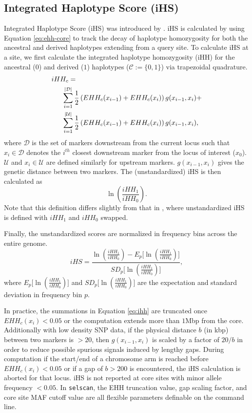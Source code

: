 \documentclass[12pt]{article}%
\newcommand{\negspace}{\!\!\!\!\!\!\!\!\!\!\!\!}
\begin{document}
\subsection{Integrated Haplotype Score (iHS)}\label{sec:ihs}

Integrated Haplotype Score (iHS) was introduced by \cite{VoightEtAl06}. iHS is calculated by using Equation \ref{eq:ehh-core} to track the decay of haplotype homozygosity
for both the ancestral and derived haplotypes extending from a query site.
To calculate iHS at a site, we first calculate the integrated haplotype 
homozygosity (iHH) for the ancestral ($0$) and derived ($1$) haplotypes 
($\mathcal{C} := \{0,1\}$) via trapezoidal quadrature.
\begin{align}\label{eq:ihh}
iHH_c =& \notag\\
&\negspace\sum_{i = 1}^{|\mathcal{D}|} \frac{1}{2}\left(EHH_c(x_{i-1}) + EHH_c(x_i)\right)g(x_{i-1},x_i) + \notag\\
&\negspace\sum_{i = 1}^{|\mathcal{U}|} \frac{1}{2}\left(EHH_c(x_{i-1}) + EHH_c(x_i)\right)g(x_{i-1},x_i),
\end{align}
where $\mathcal{D}$ is the set of markers downstream from the current locus 
such that $x_i \in \mathcal{D}$ denotes the $i^{th}$ closest downstream 
marker from the locus of interest ($x_0$). $\mathcal{U}$ and $x_i \in \mathcal{U}$ are defined similarly 
for upstream markers. $g(x_{i-1},x_i)$ gives the genetic distance between two 
markers.  The (unstandardized) iHS is then calculated as
\begin{equation}
\ln\left(\frac{iHH_1}{iHH_0}\right).
\end{equation}
Note that this definition differs slightly from that in \cite{VoightEtAl06}, where 
unstandardized iHS is defined with $iHH_1$ and $iHH_0$ swapped.

Finally, the unstandardized scores are normalized in frequency bins across the 
entire genome.
\begin{equation}
iHS = \frac{\ln\left(\frac{iHH_1}{iHH_0}\right) - E_p\Big[\ln\left(\frac{iHH_1}{iHH_0}\right)\Big]}{SD_p\Big[\ln\left(\frac{iHH_1}{iHH_0}\right)\Big]},
\end{equation}
where $E_p\Big[\ln\left(\frac{iHH_1}{iHH_0}\right)\Big]$ and 
$SD_p\Big[\ln\left(\frac{iHH_1}{iHH_0}\right)\Big]$ are the expectation and 
standard deviation in frequency bin $p$.

In practice, the summations in Equation \ref{eq:ihh} are truncated once 
$EHH_c(x_i) < 0.05$ or the computation extends more than $1$Mbp from the core.  Additionally with low density SNP data, if the physical 
distance $b$ (in kbp) between two markers is $> 20$, then $g(x_{i-1},x_i)$ is 
scaled by a factor of $20/b$ in order to reduce possible spurious signals 
induced by lengthy gaps.  During computation if the start/end of a chromosome 
arm is reached before $EHH_c(x_i) < 0.05$ or if a gap of $b > 200$ is 
encountered, the iHS calculation is aborted for that locus.  iHS is not 
reported at core sites with minor allele frequency $< 0.05$.  In {\tt selscan}, the 
EHH truncation value, gap scaling factor, and core site MAF cutoff value are
all flexible parameters definable on the command line.
\end{document}
